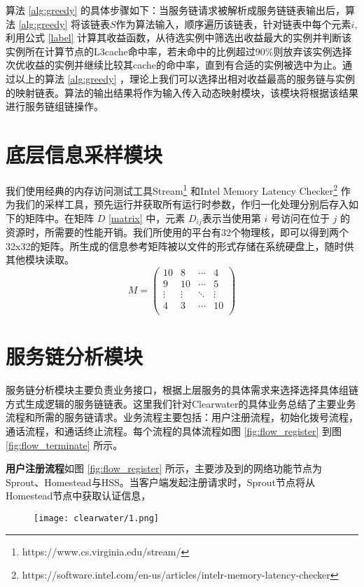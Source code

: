 算法 \ref{alg:greedy} 的具体步骤如下：当服务链请求被解析成服务链链表输出后，算法 \ref{alg:greedy} 将该链表$S$作为算法输入，顺序遍历该链表，针对链表中每个元素$i$,利用公式 \ref{label} 计算其收益函数，从待选实例中筛选出收益最大的实例并判断该实例所在计算节点的L3cache命中率，若未命中的比例超过90\%则放弃该实例选择次优收益的实例并继续比较其cache的命中率，直到有合适的实例被选中为止。通过以上的算法 \ref{alg:greedy} ，理论上我们可以选择出相对收益最高的服务链与实例的映射链表。算法的输出结果将作为输入传入动态映射模块，该模块将根据该结果进行服务链组链操作。


\section{底层信息采样模块}
我们使用经典的内存访问测试工具Stream\footnote{https://www.cs.virginia.edu/stream/} 和Intel Memory Latency Checker\footnote{https://software.intel.com/en-us/articles/intelr-memory-latency-checker} 作为我们的采样工具，预先运行并获取所有运行时参数，作归一化处理分别后存入如下的矩阵中。在矩阵 $D$ \ref{matrix} 中，元素 $D_{ij}$表示当使用第 $i$ 号访问在位于 $j$ 的资源时，所需要的性能开销。我们所使用的平台有32个物理核，即可以得到两个32x32的矩阵。所生成的信息参考矩阵被以文件的形式存储在系统硬盘上，随时供其他模块读取。
$$
M =
\begin{pmatrix}
\label{matrix}
10      & 8      & \cdots & 4      \\
9      & 10      & \cdots & 5      \\
\vdots & \vdots & \ddots & \vdots \\
4      & 3      & \cdots & 10     \\
\end{pmatrix}
$$


\section{服务链分析模块}
服务链分析模块主要负责业务接口，根据上层服务的具体需求来选择选择具体组链方式生成逻辑的服务链链表。这里我们针对Clearwater的具体业务总结了主要业务流程和所需的服务链请求。业务流程主要包括：用户注册流程，初始化拨号流程，通话流程，和通话终止流程。每个流程的具体流程如图 \ref{fig:flow_register} 到图 \ref{fig:flow_terminate} 所示。

\textbf{用户注册流程}如图 \ref{fig:flow_register} 所示，主要涉及到的网络功能节点为Sprout、Homestead与HSS。当客户端发起注册请求时，Sprout节点将从Homestead节点中获取认证信息，
\begin{figure}[!htp]
	\centering
	\texttt{[image: clearwater/1.png]}
\end{figure}

